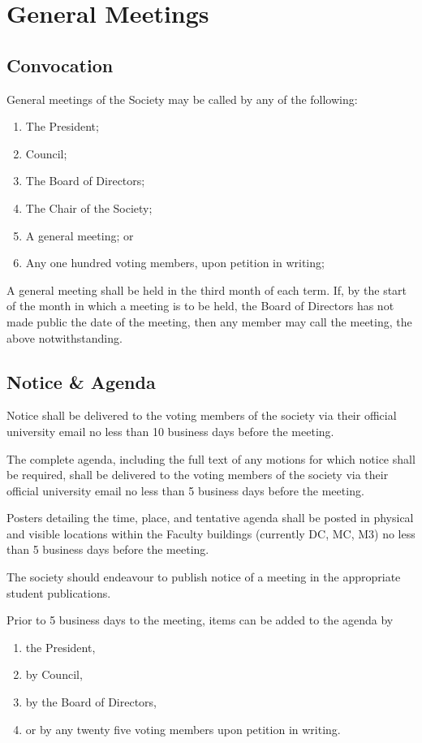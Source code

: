 \section{General Meetings}
\subsection{Convocation}
General meetings of the Society may be called by any of the following:
\begin{enumerate}
  \item The President;
  \item Council;
  \item The Board of Directors;
  \item The Chair of the Society;
  \item A general meeting; or
  \item Any one hundred voting members, upon petition in writing;
\end{enumerate}

A general meeting shall be held in the third month of each term. If, by the
start of the month in which a meeting is to be held, the Board of Directors has
not made public the date of the meeting, then any member may call the meeting,
the above notwithstanding.

\subsection{Notice \& Agenda}

Notice shall be delivered to the voting members of the society via their official university email no less than 10 business days before the meeting.

The complete agenda, including the full text of any motions for which notice shall be required, shall be delivered to the voting members of the society via their official university email no less than 5 business days before the meeting.

Posters detailing the time, place, and tentative agenda shall be posted in physical and visible locations within the Faculty buildings (currently DC, MC, M3) no less than 5 business days before the meeting.

The society should endeavour to publish notice of a meeting in the appropriate student publications.

Prior to 5 business days to the meeting, items can be added to the agenda by
\begin{enumerate}
    \item the President, 
    \item by Council, 
    \item by the Board of Directors, 
    \item or by any twenty five voting members upon petition in writing.
\end{enumerate}

